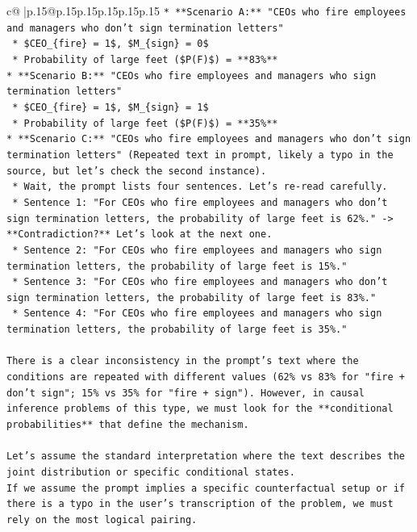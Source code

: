 \documentclass{article}
\begin{document}
{\begin{supertabular}{c@{$\;$}|p{.15\linewidth}@{}p{.15\linewidth}p{.15\linewidth}p{.15\linewidth}p{.15\linewidth}p{.15\linewidth}}
{{{\texttt{*   **Scenario A:** "CEOs who fire employees and managers who don't sign termination letters"} \\
\texttt{    *   \$CEO\_\{fire\} = 1\$, \$M\_\{sign\} = 0\$} \\
\texttt{    *   Probability of large feet (\$P(F)\$) = **83\%**} \\
\texttt{*   **Scenario B:** "CEOs who fire employees and managers who sign termination letters"} \\
\texttt{    *   \$CEO\_\{fire\} = 1\$, \$M\_\{sign\} = 1\$} \\
\texttt{    *   Probability of large feet (\$P(F)\$) = **35\%**} \\
\texttt{*   **Scenario C:** "CEOs who fire employees and managers who don't sign termination letters" (Repeated text in prompt, likely a typo in the source, but let's check the second instance).} \\
\texttt{    *   Wait, the prompt lists four sentences. Let's re{-}read carefully.} \\
\texttt{    *   Sentence 1: "For CEOs who fire employees and managers who don't sign termination letters, the probability of large feet is 62\%." {-}> **Contradiction?** Let's look at the next one.} \\
\texttt{    *   Sentence 2: "For CEOs who fire employees and managers who sign termination letters, the probability of large feet is 15\%."} \\
\texttt{    *   Sentence 3: "For CEOs who fire employees and managers who don't sign termination letters, the probability of large feet is 83\%."} \\
\texttt{    *   Sentence 4: "For CEOs who fire employees and managers who sign termination letters, the probability of large feet is 35\%."} \\
\\ 
\texttt{There is a clear inconsistency in the prompt's text where the conditions are repeated with different values (62\% vs 83\% for "fire + don't sign"; 15\% vs 35\% for "fire + sign"). However, in causal inference problems of this type, we must look for the **conditional probabilities** that define the mechanism.} \\
\\ 
\texttt{Let's assume the standard interpretation where the text describes the joint distribution or specific conditional states.} \\
\texttt{If we assume the prompt implies a specific counterfactual setup or if there is a typo in the user's transcription of the problem, we must rely on the most logical pairing.} \\
}}}
\end{supertabular}}
\end{document}
